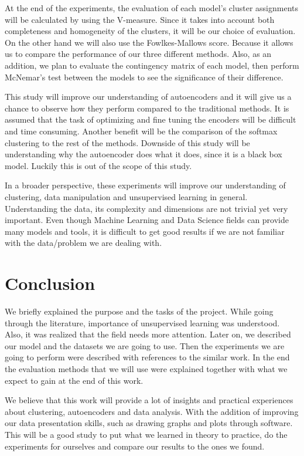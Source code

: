 \documentclass[journal]{IEEEtran}
\begin{document}
At the end of the experiments, the evaluation of each model's cluster assignments will be calculated by using the V-measure. Since it takes into account both completeness and homogeneity of the clusters, it will be our choice of evaluation\cite{rosenberg2007v}. On the other hand we will also use the Fowlkes-Mallows score. Because it allows us to compare the performance of our three different methods\cite{fowlkes1983method}. Also, as an addition, we plan to evaluate the contingency matrix of each model, then perform McNemar's test between the models to see the significance of their difference.\par

This study will improve our understanding of autoencoders and it will give us a chance to observe how they perform compared to the traditional methods. It is assumed that the task of optimizing and fine tuning the encoders will be difficult and time consuming. Another benefit will be the comparison of the softmax clustering to the rest of the methods. Downside of this study will be understanding why the autoencoder does what it does, since it is a black box model. Luckily this is out of the scope of this study. 

In a broader perspective, these experiments will improve our understanding of clustering, data manipulation and unsupervised learning in general. Understanding the data, its complexity and dimensions are not trivial yet very important. Even though Machine Learning and Data Science fields can provide many models and tools, it is difficult to get good results if we are not familiar with the data/problem we are dealing with.\par

\section{Conclusion}

We briefly explained the purpose and the tasks of the project. While going through the literature, importance of unsupervised learning was understood. Also, it was realized that the field needs more attention. Later on, we described our model and the datasets we are going to use. Then the experiments we are going to perform were described with references to the similar work. In the end the evaluation methods that we will use were explained together with what we expect to gain at the end of this work.\par

We believe that this work will provide a lot of insights and practical experiences about clustering, autoencoders and data analysis. With the addition of improving our data presentation skills, such as drawing graphs and plots through software. This will be a good study to put what we learned in theory to practice, do the experiments for ourselves and compare our results to the ones we found. 
\newpage
\end{document}
